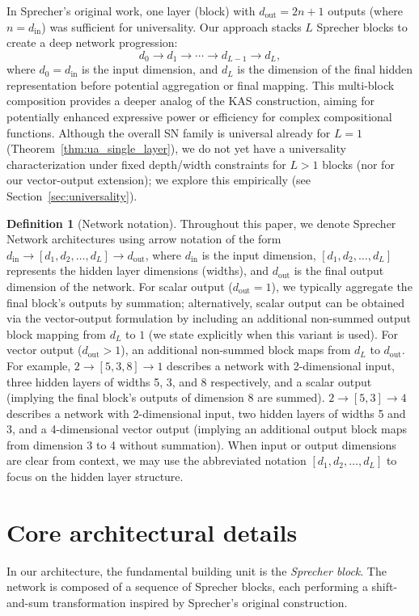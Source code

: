 \documentclass{article}
\theoremstyle{plain}
\theoremstyle{definition}
\newtheorem{definition}{Definition}
\theoremstyle{remark}
\begin{document}
In Sprecher's original work, one layer (block) with $d_{\mathrm{out}} = 2n+1$ outputs (where $n=d_{\mathrm{in}}$) was sufficient for universality. Our approach stacks $L$ Sprecher blocks to create a deep network progression:
$$ d_0 \to d_1 \to \cdots \to d_{L-1} \to d_L, $$
where $d_0=d_{\mathrm{in}}$ is the input dimension, and $d_L$ is the dimension of the final hidden representation before potential aggregation or final mapping. This multi-block composition provides a deeper analog of the KAS construction, aiming for potentially enhanced expressive power or efficiency for complex compositional functions. Although the overall SN family is universal already for $L=1$ (Theorem~\ref{thm:ua_single_layer}), we do not yet have a universality characterization under fixed depth/width constraints for $L>1$ blocks (nor for our vector-output extension); we explore this empirically (see Section~\ref{sec:universality}).

\begin{definition}[Network notation]
Throughout this paper, we denote Sprecher Network architectures using arrow notation of the form $d_{\mathrm{in}}\to[d_1,d_2,\ldots,d_L]\to d_{\mathrm{out}}$, where $d_{\mathrm{in}}$ is the input dimension, $[d_1,d_2,\ldots,d_L]$ represents the hidden layer dimensions (widths), and $d_{\mathrm{out}}$ is the final output dimension of the network. For scalar output ($d_{\mathrm{out}}=1$), we typically aggregate the final block's outputs by summation; alternatively, scalar output can be obtained via the vector-output formulation by including an additional non-summed output block mapping from $d_L$ to $1$ (we state explicitly when this variant is used). For vector output ($d_{\mathrm{out}}>1$), an additional non-summed block maps from $d_L$ to $d_{\mathrm{out}}$. For example, $2\to[5,3,8]\to1$ describes a network with 2-dimensional input, three hidden layers of widths 5, 3, and 8 respectively, and a scalar output (implying the final block's outputs of dimension 8 are summed). $2\to[5,3]\to4$ describes a network with 2-dimensional input, two hidden layers of widths 5 and 3, and a 4-dimensional vector output (implying an additional output block maps from dimension 3 to 4 without summation). When input or output dimensions are clear from context, we may use the abbreviated notation $[d_1,d_2,\ldots,d_L]$ to focus on the hidden layer structure.
\end{definition}

\section{Core architectural details}
In our architecture, the fundamental building unit is the \emph{Sprecher block}. The network is composed of a sequence of Sprecher blocks, each performing a shift-and-sum transformation inspired by Sprecher's original construction.
\end{document}
